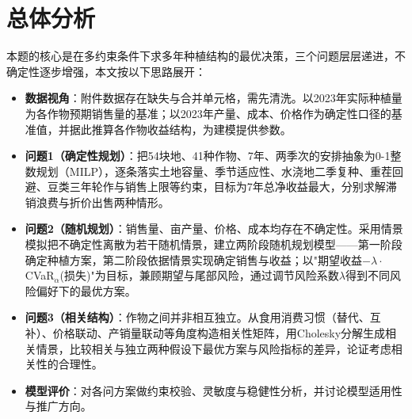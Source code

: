 \section{总体分析}

本题的核心是在多约束条件下求多年种植结构的最优决策，三个问题层层递进，不确定性逐步增强，本文按以下思路展开：

\begin{itemize}
	\item \textbf{数据视角}：附件数据存在缺失与合并单元格，需先清洗。以2023年实际种植量为各作物预期销售量的基准；以2023年产量、成本、价格作为确定性口径的基准值，并据此推算各作物收益结构，为建模提供参数。
	\item \textbf{问题1（确定性规划）}：把54块地、41种作物、7年、两季次的安排抽象为0-1整数规划（MILP），逐条落实土地容量、季节适应性、水浇地二季复种、重茬回避、豆类三年轮作与销售上限等约束，目标为7年总净收益最大，分别求解滞销浪费与折价出售两种情形。
	\item \textbf{问题2（随机规划）}：销售量、亩产量、价格、成本均存在不确定性。采用情景模拟把不确定性离散为若干随机情景，建立两阶段随机规划模型——第一阶段确定种植方案，第二阶段依据情景实现确定销售与收益；以"期望收益$-\lambda\cdot$CVaR$_\alpha$(损失)"为目标，兼顾期望与尾部风险，通过调节风险系数$\lambda$得到不同风险偏好下的最优方案。
	\item \textbf{问题3（相关结构）}：作物之间并非相互独立。从食用消费习惯（替代、互补）、价格联动、产销量联动等角度构造相关性矩阵，用Cholesky分解生成相关情景，比较相关与独立两种假设下最优方案与风险指标的差异，论证考虑相关性的合理性。
	\item \textbf{模型评价}：对各问方案做约束校验、灵敏度与稳健性分析，并讨论模型适用性与推广方向。
\end{itemize}
